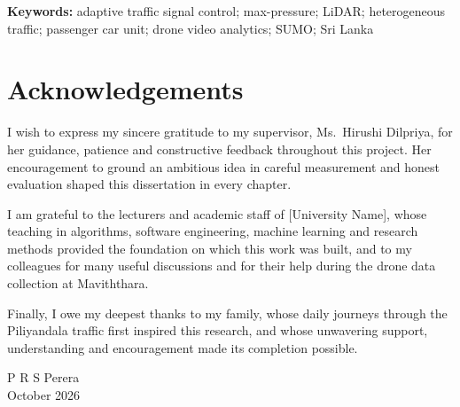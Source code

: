 \vspace{0.5cm}
\noindent\textbf{Keywords:} adaptive traffic signal control; max-pressure; LiDAR; heterogeneous traffic; passenger car unit; drone video analytics; SUMO; Sri Lanka

\chapter*{Acknowledgements}
\thispagestyle{plain}

I wish to express my sincere gratitude to my supervisor, Ms.\ Hirushi Dilpriya, for her guidance, patience and constructive feedback throughout this project. Her encouragement to ground an ambitious idea in careful measurement and honest evaluation shaped this dissertation in every chapter.

I am grateful to the lecturers and academic staff of [University Name], whose teaching in algorithms, software engineering, machine learning and research methods provided the foundation on which this work was built, and to my colleagues for many useful discussions and for their help during the drone data collection at Maviththara.

Finally, I owe my deepest thanks to my family, whose daily journeys through the Piliyandala traffic first inspired this research, and whose unwavering support, understanding and encouragement made its completion possible.

\vspace{1cm}
\begin{flushright}
P R S Perera\\
October 2026
\end{flushright}
